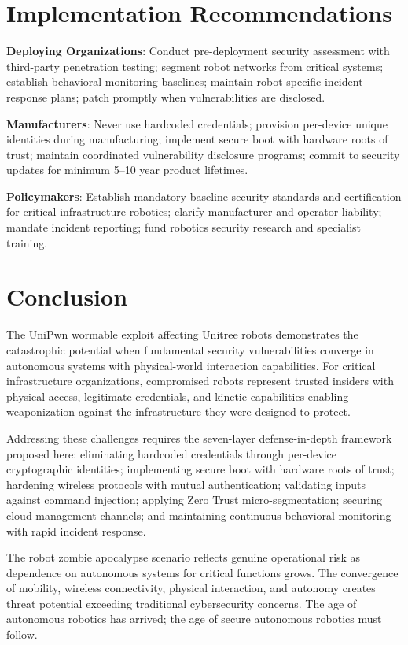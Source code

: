 \documentclass[journal]{IEEEtran}
\begin{document}
\section{Implementation Recommendations}

\textbf{Deploying Organizations}: Conduct pre-deployment security assessment with
third-party penetration testing; segment robot networks from critical systems; establish
behavioral monitoring baselines; maintain robot-specific incident response plans; patch
promptly when vulnerabilities are disclosed.

\textbf{Manufacturers}: Never use hardcoded credentials; provision per-device unique
identities during manufacturing; implement secure boot with hardware roots of trust;
maintain coordinated vulnerability disclosure programs; commit to security updates for
minimum 5--10 year product lifetimes.

\textbf{Policymakers}: Establish mandatory baseline security standards and certification
for critical infrastructure robotics; clarify manufacturer and operator liability; mandate
incident reporting; fund robotics security research and specialist training.

\section{Conclusion}

The UniPwn wormable exploit affecting Unitree robots demonstrates the catastrophic
potential when fundamental security vulnerabilities converge in autonomous systems with
physical-world interaction capabilities. For critical infrastructure organizations,
compromised robots represent trusted insiders with physical access, legitimate credentials,
and kinetic capabilities enabling weaponization against the infrastructure they were
designed to protect.

Addressing these challenges requires the seven-layer defense-in-depth framework proposed
here: eliminating hardcoded credentials through per-device cryptographic identities;
implementing secure boot with hardware roots of trust; hardening wireless protocols with
mutual authentication; validating inputs against command injection; applying Zero Trust
micro-segmentation; securing cloud management channels; and maintaining continuous
behavioral monitoring with rapid incident response.

The robot zombie apocalypse scenario reflects genuine operational risk as dependence on
autonomous systems for critical functions grows. The convergence of mobility, wireless
connectivity, physical interaction, and autonomy creates threat potential exceeding
traditional cybersecurity concerns. The age of autonomous robotics has arrived; the age
of secure autonomous robotics must follow.
\end{document}
